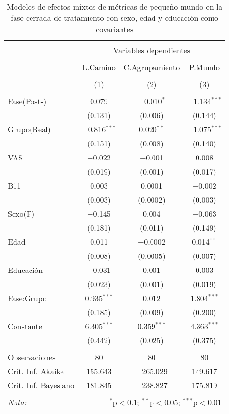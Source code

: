 \begin{table}[!htb] \centering
    \small
  \caption{Modelos de efectos mixtos de métricas de pequeño mundo en la fase cerrada de tratamiento con sexo, edad y educación como covariantes}
  \label{tab:memT2}
\begin{tabular}{@{\extracolsep{5pt}}lccc}
\\[-1.8ex]\hline
\hline \\[-1.8ex]
 & \multicolumn{3}{c}{Variables dependientes} \\
\cline{2-4}
\\[-1.8ex] & L.Camino & C.Agrupamiento & P.Mundo \\
\\[-1.8ex] & (1) & (2) & (3)\\
\hline \\[-1.8ex]
 Fase(Post-) & 0.079 & $-$0.010$^{*}$ & $-$1.134$^{***}$ \\
  & (0.131) & (0.006) & (0.144) \\
  Grupo(Real) & $-$0.816$^{***}$ & 0.020$^{**}$ & $-$1.075$^{***}$ \\
  & (0.151) & (0.008) & (0.140) \\
  VAS & $-$0.022 & $-$0.001 & 0.008 \\
  & (0.019) & (0.001) & (0.017) \\
  B11 & 0.003 & 0.0001 & $-$0.002 \\
  & (0.003) & (0.0002) & (0.003) \\
  Sexo(F) & $-$0.145 & 0.004 & $-$0.063 \\
  & (0.181) & (0.011) & (0.149) \\
  Edad & 0.011 & $-$0.0002 & 0.014$^{**}$ \\
  & (0.008) & (0.0005) & (0.007) \\
  Educación & $-$0.031 & 0.001 & 0.003 \\
  & (0.023) & (0.001) & (0.019) \\
  Fase:Grupo & 0.935$^{***}$ & 0.012 & 1.804$^{***}$ \\
  & (0.185) & (0.009) & (0.200) \\
  Constante & 6.305$^{***}$ & 0.359$^{***}$ & 4.363$^{***}$ \\
  & (0.442) & (0.025) & (0.375) \\
 \hline \\[-1.8ex]
Observaciones & 80 & 80 & 80 \\
Crit. Inf. Akaike & 155.643 & $-$265.029 & 149.617 \\
Crit. Inf. Bayesiano & 181.845 & $-$238.827 & 175.819 \\
\hline
\hline \\[-1.8ex]
\textit{Nota:}  & \multicolumn{3}{r}{$^{*}$p$<$0.1; $^{**}$p$<$0.05; $^{***}$p$<$0.01} \\
\end{tabular}
\end{table}

